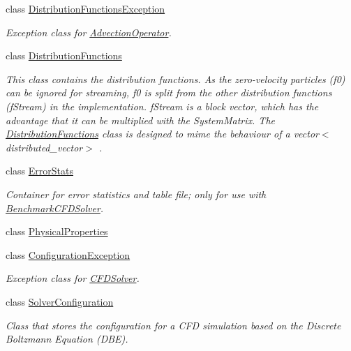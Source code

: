 \begin{DoxyCompactItemize}
class \hyperlink{classnatrium_1_1DistributionFunctionsException}{DistributionFunctionsException}
\begin{DoxyCompactList}\small\item\em Exception class for \hyperlink{classnatrium_1_1AdvectionOperator}{AdvectionOperator}. \item\end{DoxyCompactList}\item 
class \hyperlink{classnatrium_1_1DistributionFunctions}{DistributionFunctions}
\begin{DoxyCompactList}\small\item\em This class contains the distribution functions. As the zero-\/velocity particles (f0) can be ignored for streaming, f0 is split from the other distribution functions (fStream) in the implementation. fStream is a block vector, which has the advantage that it can be multiplied with the SystemMatrix. The \hyperlink{classnatrium_1_1DistributionFunctions}{DistributionFunctions} class is designed to mime the behaviour of a vector$<$distributed\_\-vector$>$ . \item\end{DoxyCompactList}\item 
class \hyperlink{classnatrium_1_1ErrorStats}{ErrorStats}
\begin{DoxyCompactList}\small\item\em Container for error statistics and table file; only for use with \hyperlink{classnatrium_1_1BenchmarkCFDSolver}{BenchmarkCFDSolver}. \item\end{DoxyCompactList}\item 
class \hyperlink{classnatrium_1_1PhysicalProperties}{PhysicalProperties}
\item 
class \hyperlink{classnatrium_1_1ConfigurationException}{ConfigurationException}
\begin{DoxyCompactList}\small\item\em Exception class for \hyperlink{classnatrium_1_1CFDSolver}{CFDSolver}. \item\end{DoxyCompactList}\item 
class \hyperlink{classnatrium_1_1SolverConfiguration}{SolverConfiguration}
\begin{DoxyCompactList}\small\item\em Class that stores the configuration for a CFD simulation based on the Discrete Boltzmann Equation (DBE). \item\end{DoxyCompactList}\item 

\end{DoxyCompactItemize}
